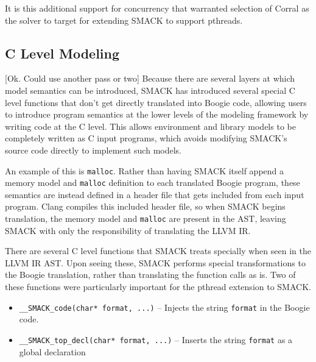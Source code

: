 It is this additional support for concurrency that warranted selection
of Corral as the solver to target for extending SMACK to support pthreads.

\subsection{C Level Modeling}
[Ok.  Could use another pass or two]
Because there are several layers at which model semantics can be
introduced, SMACK has introduced several special C level functions 
that don't get directly translated into Boogie code, allowing users to
introduce program semantics at the lower levels of the modeling
framework by writing code at the C level.  This allows environment and
library models to be completely written as C input programs, which
avoids modifying SMACK's source code directly to implement such
models.

An example of this is \lstinline|malloc|.  Rather than having SMACK
itself append a memory model and \lstinline|malloc| definition to each
translated Boogie program, these semantics are instead defined in a
header file that gets included from each input program.  Clang
compiles this included header file, so when SMACK begins translation,
the memory model and \lstinline|malloc| are present in the AST,
leaving SMACK with only the responsibility of translating the LLVM IR.

There are several C level functions that SMACK treats specially when
seen in the LLVM IR AST.  Upon seeing these, SMACK performs special
transformations to the Boogie translation, rather than translating the
function calls as is.  Two of these functions were particularly
important for the pthread extension to SMACK. 


\begin{itemize}
\item \lstinline|__SMACK_code(char* format, ...)| -- Injects the
  string \lstinline|format| in the Boogie code.
\item \lstinline|__SMACK_top_decl(char* format, ...)| -- Inserts the
  string \lstinline|format| as a global declaration 
\end{itemize}


